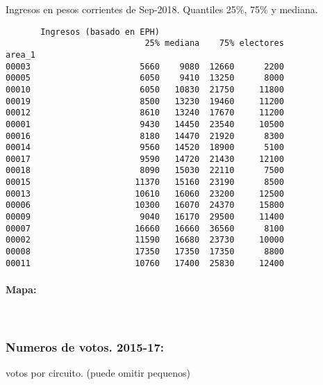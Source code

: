 \documentclass[11pt]{article}
\begin{document}
    
    Ingresos en pesos corrientes de Sep-2018. Quantiles 25\%, 75\% y
mediana.

    
    
    \begin{verbatim}
       Ingresos (basado en EPH)                         
                            25% mediana    75% electores
area_1                                                  
00003                      5660    9080  12660      2200
00005                      6050    9410  13250      8000
00010                      6050   10830  21750     11800
00019                      8500   13230  19460     11200
00012                      8610   13240  17670     11200
00001                      9430   14450  23540     10500
00016                      8180   14470  21920      8300
00014                      9560   14520  18900      5100
00017                      9590   14720  21430     12100
00018                      8090   15030  22110      7500
00015                     11370   15160  23190      8500
00013                     10610   16060  23200     12500
00006                     10300   16070  24370     15800
00009                      9040   16170  29500     11400
00007                     16660   16660  36560      8100
00002                     11590   16680  23730     10000
00008                     17350   17350  17350      8800
00011                     10760   17400  25830     12400
    \end{verbatim}

    
    \hypertarget{mapa}{%
\paragraph{Mapa:}\label{mapa}}

    
    \begin{center}
    \end{center}
    { \hspace*{\fill} \\}
    
    \hypertarget{numeros-de-votos.-2015-17}{%
\subsubsection{Numeros de votos.
2015-17:}\label{numeros-de-votos.-2015-17}}

    
    votos por circuito. (puede omitir pequenos)

    
    
\end{document}

